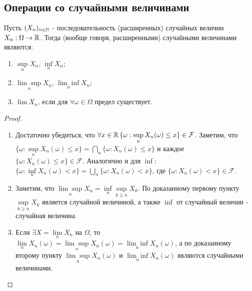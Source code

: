 \subsection{Операции со случайными величинами}
\begin{theorem}\label{lect05:th1}
	Пусть $(X_n)_{n \in \mathbb{N}}$ - последовательность (расширенных) случайных величин $X_n : \Omega \to \mathbb{R}$. Тогда (вообще говоря, расширенными) случайными величинами являются:
	
	\begin{enumerate}
		\item $\sup \limits_n X_n,\, \inf \limits_n X_n$;
		\item $\underset{n}{\lim \sup} X_n,\, \underset{n}{\lim \inf}X_n$;
		\item $\lim X_n$, если для $\forall \omega \in \Omega$ предел существует.
	\end{enumerate}
\end{theorem}
\begin{proof}\,
	
	
	\begin{enumerate}
		\item Достаточно убедиться, что $\forall x \in \mathbb{R} \, \{\omega: \sup \limits_n X_n (\omega) \leq x\} \in \mathcal{F}$. Заметим, что $\{\omega: \sup \limits_n X_n (\omega) \leq x\} = \bigcap \limits_n \{\omega: X_n (\omega) \leq x\}$ и каждое $\{\omega: X_n (\omega) \leq x\} \in \mathcal{F}$. Аналогично и для $\inf$: $\{\omega: \inf \limits_n X_n (\omega) < x\} = \bigcup \limits_n \{ \omega : X_n (\omega) < x\}$, где $\{ \omega : X_n (\omega) < x\} \in \mathcal{F}$.
		\item Заметим, что $\underset{n}{\lim \sup} X_n = \inf \limits_n \sup \limits_{k \geq n} X_k$. По доказанному первому пункту $\sup \limits_{k \geq n} X_k$ является случайной величиной, а также $\inf$ от случайный величин - случайная величина.
		\item Если $\exists X = \lim \limits_n X_n$ на $\Omega$, то $\lim \limits_n X_n (\omega) = \underset{n}{\lim \sup} X_n (\omega) = \underset{n}{\lim \inf} X_n (\omega)$, а по доказанному второму пункту $\underset{n}{\lim \sup} X_n (\omega)$ и $ \underset{n}{\lim \inf} X_n (\omega)$ являются случайными величинами.
	\end{enumerate}        
\end{proof}

